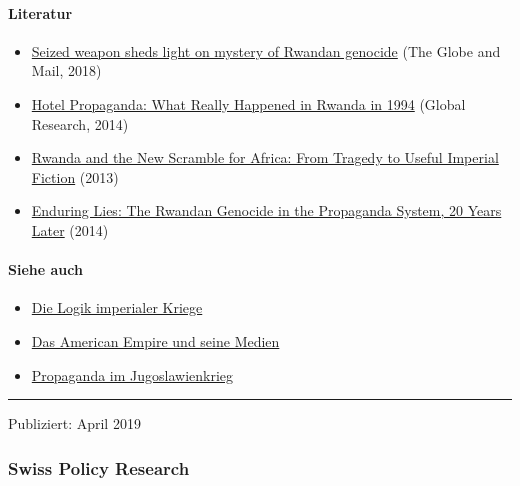 \hypertarget{literatur}{%
\paragraph{Literatur}\label{literatur}}

\begin{itemize}
\tightlist
\item
  \href{https://www.theglobeandmail.com/news/world/seized-weapon-sheds-light-on-mystery-of-rwandan-genocide/article34125905/}{Seized
  weapon sheds light on mystery of Rwandan genocide} (The Globe and
  Mail, 2018)
\item
  \href{https://www.globalresearch.ca/hotel-propaganda-what-really-happened-in-rwanda-in-1994/5403235}{Hotel
  Propaganda: What Really Happened in Rwanda in 1994} (Global Research,
  2014)
\item
  \href{https://www.amazon.de/Rwanda-New-Scramble-Africa-Imperial/dp/1926824946}{Rwanda
  and the New Scramble for Africa: From Tragedy to Useful Imperial
  Fiction} (2013)
\item
  \href{https://www.amazon.de/Enduring-Lies-Rwandan-Genocide-Propaganda/dp/1500751111/}{Enduring
  Lies: The Rwandan Genocide in the Propaganda System, 20 Years Later}
  (2014)
\end{itemize}

\hypertarget{siehe-auch}{%
\paragraph{Siehe auch}\label{siehe-auch}}

\begin{itemize}
\tightlist
\item
  \href{https://swprs.org/logik-imperialer-kriege/}{Die Logik imperialer
  Kriege}
\item
  \href{https://swprs.org/das-american-empire-und-seine-medien/}{Das
  American Empire und seine Medien}
\item
  \href{https://swprs.org/propaganda-im-jugoslawienkrieg/}{Propaganda im
  Jugoslawienkrieg}
\end{itemize}

\begin{center}\rule{0.5\linewidth}{\linethickness}\end{center}

Publiziert: April 2019

\hypertarget{swiss-policy-research}{%
\subsubsection{Swiss Policy Research}\label{swiss-policy-research}}

